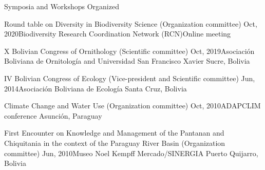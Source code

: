 \documentclass{resume} %
\begin{document}
\begin{rSection}{Symposia and Workshops Organized}

\normalfont

\begin{sSubsection}{Round table on Diversity in Biodiversity Science}{ (Organization committee) }{Oct, 2020}{Biodiversity Research Coordination Network (RCN)}{Online meeting}
\end{sSubsection}

\begin{sSubsection}{X Bolivian Congress of Ornithology }{ (Scientific committee) }{Oct, 2019}{Asociación Boliviana de Ornitología and Universidad San Francisco Xavier}{ Sucre, Bolivia}
\end{sSubsection}

\begin{sSubsection}{IV Bolivian Congress of Ecology }{ (Vice-president and Scientific committee) }{Jun, 2014}{Asociación Boliviana de Ecología }{ Santa Cruz, Bolivia}
\end{sSubsection}

\begin{sSubsection}{Climate Change and Water Use }{ (Organization committee) }{Oct, 2010}{ADAPCLIM conference }{ Asunción, Paraguay}
\end{sSubsection}

\begin{sSubsection}{First Encounter on Knowledge and Management of the Pantanan and Chiquitania in the context of the Paraguay River Basin}{ (Organization committee) }{Jun, 2010}{Museo Noel Kempff Mercado/SINERGIA }{ Puerto Quijarro, Bolivia}
\end{sSubsection}

\end{rSection}
\end{document}

